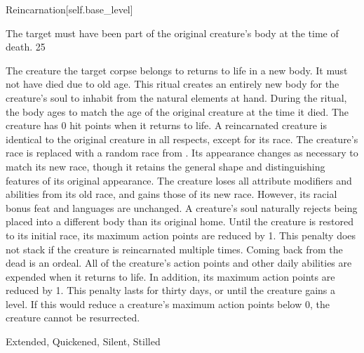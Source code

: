 \begin{spellsection}{Reincarnation}[self.base_level]
\begin{spellcontent}
\begin{spelltargetinginfo}
\spellspecial The target must have been part of the original creature's body at the time of death.
 25
\end{spelltargetinginfo}
\begin{spelleffects}
\spelleffect
The creature the target corpse belongs to returns to life in a new body.
It must not have died due to old age.
This ritual creates an entirely new body for the creature's soul to inhabit from the natural elements at hand.
During the ritual, the body ages to match the age of the original creature at the time it died.
The creature has 0 hit points when it returns to life.
A reincarnated creature is identical to the original creature in all respects, except for its race.
The creature's race is replaced with a random race from .
Its appearance changes as necessary to match its new race, though it retains the general shape and distinguishing features of its original appearance.
The creature loses all attribute modifiers and abilities from its old race, and gains those of its new race.
However, its racial bonus feat and languages are unchanged.
A creature's soul naturally rejects being placed into a different body than its original home.
Until the creature is restored to its initial race, its maximum action points are reduced by 1.
This penalty does not stack if the creature is reincarnated multiple times.
Coming back from the dead is an ordeal.
All of the creature's action points and other daily abilities are expended when it returns to life.
In addition, its maximum action points are reduced by 1.
This penalty lasts for thirty days, or until the creature gains a level.
If this would reduce a creature's maximum action points below 0, the creature cannot be resurrected.
\end{spelleffects}
\end{spellcontent}
\begin{spellfooter}
 Extended, Quickened, Silent, Stilled
\end{spellfooter}
\begin{spellsubcontent}
\end{spellsubcontent}
\end{spellsection}
